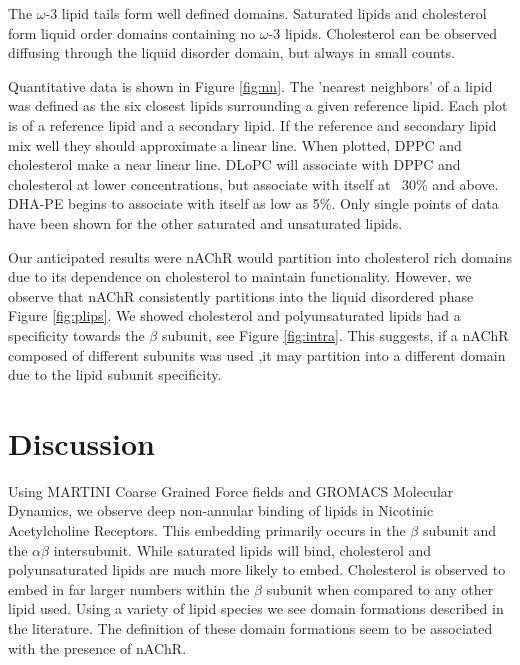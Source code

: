 \documentclass[10pt, letterpaper]{article}
\begin{document}
The $\omega$-3 lipid tails form well defined domains. Saturated lipids and cholesterol form liquid order domains containing no $\omega$-3 lipids. Cholesterol can be observed diffusing through the liquid disorder domain, but always in small counts. 

Quantitative data is shown in Figure \ref{fig:nn}. The 'nearest neighbors' of a lipid was defined as the six closest lipids surrounding a given reference lipid. Each plot is of a reference lipid and a secondary lipid. If the reference and secondary lipid mix well they should approximate a linear line. When plotted, DPPC and cholesterol make a near linear line. DLoPC will associate with DPPC and cholesterol at lower concentrations, but associate with itself at ~30\% and above. DHA-PE begins to associate with itself as low as 5\%. Only single points of data have been shown for the other saturated and unsaturated lipids.

Our anticipated results were nAChR would partition into cholesterol rich domains due to its dependence on cholesterol to maintain functionality. However, we observe that nAChR consistently partitions into the liquid disordered phase Figure \ref{fig:plips}. We showed cholesterol and polyunsaturated lipids had a specificity towards the $\beta$ subunit, see Figure \ref{fig:intra}. This suggests, if a nAChR composed of different subunits was used ,it may partition into a different domain due to the lipid subunit specificity.
 \newpage

\section{Discussion}

Using MARTINI Coarse Grained Force fields and GROMACS Molecular Dynamics, we observe deep non-annular binding of lipids in Nicotinic Acetylcholine Receptors. This embedding primarily occurs in the $\beta$ subunit and the $\alpha\beta$ intersubunit. While saturated lipids will bind, cholesterol and polyunsaturated lipids are much more likely to embed. Cholesterol is observed to embed in far larger numbers within the $\beta$ subunit when compared to any other lipid used. Using a variety of lipid species we see domain formations described in the literature. The definition of these domain formations seem to be associated with the presence of nAChR.
\end{document}
